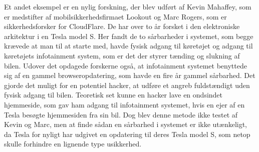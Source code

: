 Et andet eksempel er en nylig forskning, der blev udført af Kevin Mahaffey, som er medstifter af mobilsikkerhedsfirmaet Lookout og Marc Rogers, som er sikkerhedsforsker for CloudFlare. De har over to år forsket i den elektroniske arkitektur i en Tesla model S. Her fandt de to sårbarheder i systemet, som begge krævede at man til at starte med, havde fysisk adgang til køretøjet og adgang til køretøjets infotainment system, som er det der styrer tænding og slukning af bilen. Udover det opdagede forskerne også, at infotainment systemet benyttede sig af en gammel browseropdatering, som havde en fire år gammel sårbarhed. Det gjorde det muligt for en potentiel hacker, at udføre et angreb fuldstændigt uden fysisk adgang til bilen. Teoretisk set kunne en hacker lave en ondsindet hjemmeside, som gav ham adgang til infotainment systemet, hvis en ejer af en Tesla besøgte hjemmesiden fra sin bil. Dog blev denne metode ikke testet af Kevin og Marc, men at finde sådan en sårbarhed i systemet er ikke utænkeligt, da Tesla for nyligt har udgivet en opdatering til deres Tesla model S, som netop skulle forhindre en lignende type usikkerhed.  